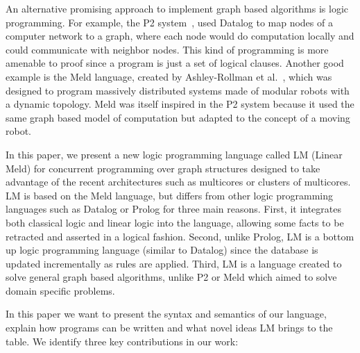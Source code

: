 An alternative promising approach to implement graph based algorithms 
is logic programming. For example, the P2 system~\cite{Loo-condie-garofalakis-p2}, used Datalog to map nodes of a computer network
to a graph, where each node would do computation locally and could communicate with neighbor nodes.
This kind of programming is more amenable to proof since a program is just a set of logical clauses.
Another good example is the Meld language, created by
Ashley-Rollman et al.~\cite{ashley-rollman-derosa-iros07wksp,ashley-rollman-iclp09}, which was designed to
program massively distributed systems made of modular robots with a dynamic topology. Meld was itself inspired
in the P2 system because it used the same graph based model of computation but adapted to the concept of a moving
robot.

In this paper, we present a new logic programming language called LM (Linear Meld) for concurrent programming over graph structures designed to take advantage of the recent architectures such as multicores or clusters of multicores. LM is based on the Meld language, but differs from other logic programming languages such as Datalog or Prolog for three main reasons. First, it integrates both classical
logic and linear logic into the language, allowing some facts to be retracted and asserted in a logical fashion. Second, unlike
Prolog, LM is a bottom up logic programming language (similar to Datalog) since the database is updated incrementally as rules are
applied. Third, LM is a language created to solve general graph based algorithms, unlike P2 or Meld which aimed to solve domain
specific problems.

In this paper we want to present the syntax and semantics of our language, explain how programs can be written
and what novel ideas LM brings to the table. We identify three key contributions in our work:

